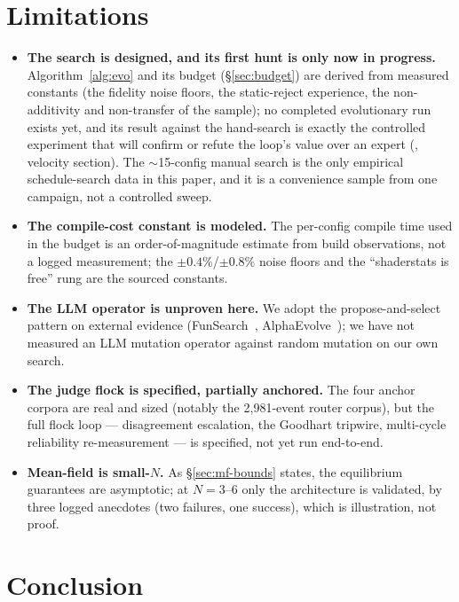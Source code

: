\documentclass[11pt]{article}
\begin{document}
\section{Limitations}
\label{sec:limits}

\begin{itemize}[leftmargin=1.4em,itemsep=2pt,topsep=2pt]
\item \textbf{The search is designed, and its first hunt is only now in progress.} Algorithm~\ref{alg:evo}
and its budget (\S\ref{sec:budget}) are derived from measured constants (the fidelity noise floors, the
static-reject experience, the non-additivity and non-transfer of the sample); no completed evolutionary run
exists yet, and its result against the hand-search is exactly the controlled experiment that will confirm or
refute the loop's value over an expert (\cite{refutation}, velocity section). The $\sim$15-config manual
search is the only empirical schedule-search data in this paper, and it is a convenience sample from one
campaign, not a controlled sweep.
\item \textbf{The compile-cost constant is modeled.} The per-config compile time used in the budget is an
order-of-magnitude estimate from build observations, not a logged measurement; the $\pm0.4\%$/$\pm0.8\%$
noise floors and the ``shaderstats is free'' rung are the sourced constants.
\item \textbf{The LLM operator is unproven here.} We adopt the propose-and-select pattern on external
evidence (FunSearch~\cite{funsearch}, AlphaEvolve~\cite{alphaevolve}); we have not measured an LLM mutation
operator against random mutation on our own search.
\item \textbf{The judge flock is specified, partially anchored.} The four anchor corpora are real and sized
(notably the 2{,}981-event router corpus), but the full flock loop --- disagreement escalation, the Goodhart
tripwire, multi-cycle reliability re-measurement --- is specified, not yet run end-to-end.
\item \textbf{Mean-field is small-$N$.} As \S\ref{sec:mf-bounds} states, the equilibrium guarantees are
asymptotic; at $N{=}3$--$6$ only the architecture is validated, by three logged anecdotes (two failures, one
success), which is illustration, not proof.
\end{itemize}

\section{Conclusion}
\label{sec:conc}
\end{document}
